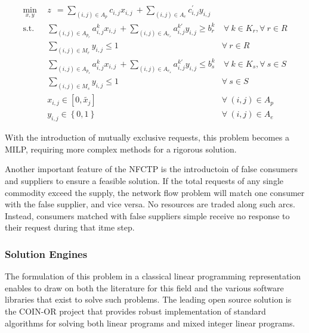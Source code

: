 \begin{subequations}\label{eqs:NFCTP}
  \begin{align}
    \min_{x, y} \:\: 
    & 
    z \:\: = 
    \sum_{(i, j) \in A_p} c_{i,j} x_{i,j} 
    \: + 
    \sum_{(i, j) \in A_e} c^{\prime}_{i,j} y_{i,j} 
    & 
    \label{eqs:NFCTP_obj} \\
    \text{s.t.} \:\:
    &
    \sum_{(i, j) \in A_{p_r}} a^k_{i,j} x_{i,j}
    \: + 
    \sum_{(i, j) \in A_{e_r}} a^{k\prime}_{i,j} y_{i,j}
    \geq b^k_r 
    &
    \: 
    \forall \: k \in K_r,  
    \forall \: r \in R 
    \label{eqs:NFCTP_req} \\
    &
    \sum_{(i, j) \in M_{r}} y_{i,j} \leq 1 
    &
    \forall \: r \in R 
    \label{eqs:NFCTP_mut_req} \\
    &
    \sum_{(i, j) \in A_{p_s}} a^k_{i,j} x_{i,j}
    \: + 
    \sum_{(i, j) \in A_{e_s}} a^{k\prime}_{i,j} y_{i,j}
    \leq b^k_s 
    &
    \: 
    \forall \: k \in K_s, 
    \forall \: s \in S 
    \label{eqs:NFCTP_sup} \\
    &
    \sum_{(i, j) \in M_{s}} y_{i,j} \leq 1 
    &
    \forall \: s \in S 
    \label{eqs:NFCTP_mut_sup} \\
    &
    x_{i,j} \in [0, \tilde{x_j}]
    &
    \forall \: (i, j) \in A_p
    \label{eqs:NFCTP_x} \\
    &
    y_{i,j} \in \left\{ 0, 1 \right\}
    &
    \forall \: (i, j) \in A_e
    \label{eqs:NFCTP_y}
  \end{align}
\end{subequations}

With the introduction of mutually exclusive requests, this problem becomes a
\gls{MILP}, requiring more complex methods for a rigorous solution.

Another important feature of the \gls{NFCTP} is the introductoin of false
consumers and suppliers to ensure a feasible solution.  If the total requests
of any single commodity exceed the supply, the network flow problem will match
one consumer with the false supplier, and vice versa.  No resources are traded
along such arcs.  Instead, consumers matched with false suppliers simple
receive no response to their request during that itme step.

\subsubsection{Solution Engines}

The formulation of this problem in a classical linear programming
representation enables \Cyclus{} to draw on both the literature for this field
and the various software libraries that exist to solve such problems.  The
leading open source solution is the \gls{COIN-OR} project \cite{COINOR} that
provides robust implementation of standard algorithms for solving both linear
programs and mixed integer linear programs.

